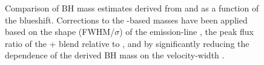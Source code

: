 \begin{figure}
    \captionsetup[subfigure]{labelformat=empty}
    \centering 
    \subfloat[\label{fig:compare_corrections_a}]{}
    \subfloat[\label{fig:compare_corrections_b}]{}
    \subfloat[\label{fig:compare_corrections_c}]{}
    \caption[{Comparison of BH mass estimates derived from  and \ha as a function of the  blueshift.}]{Comparison of BH mass estimates derived from  and \ha as a function of the  blueshift. Corrections to the -based masses have been applied based on the shape (FWHM/$\sigma$) of the  emission-line \citep[a;][]{denney12}, the peak flux ratio of the + blend relative to  \citep[b;][]{runnoe13}, and by significantly reducing the dependence of the derived BH mass on the  velocity-width \citep[c;][]{park13}.}
    \label{fig:compare_corrections}
\end{figure}

